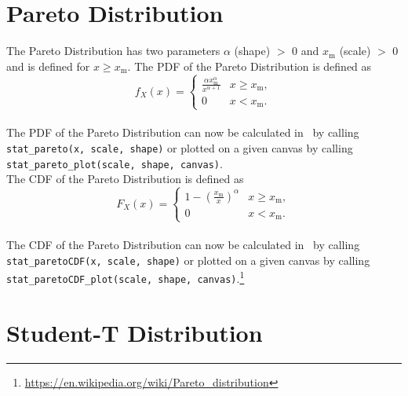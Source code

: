 	\section{Pareto Distribution}
	
		The Pareto Distribution has two parameters $\alpha$ (shape) $>$ 0 and $x_\mathrm{m}$ (scale) $>$ 0 and is defined for $x \geq x_\mathrm{m}$. The \ac{PDF} of the Pareto Distribution is defined as
		\\[0.3cm]
		$$f_X(x)= \begin{cases} \frac{\alpha x_\mathrm{m}^\alpha}{x^{\alpha+1}} & x \ge x_\mathrm{m}, \\ 0 & x < x_\mathrm{m}. \end{cases}$$
		\\[0.3cm]
		The \ac{PDF} of the Pareto Distribution can now be calculated in \setlx\ by calling \lstinline{stat_pareto(x, scale, shape)} or plotted on a given canvas by calling \lstinline{stat_pareto_plot(scale, shape, canvas)}.
		\\[0.3cm]
		The \ac{CDF} of the Pareto Distribution is defined as
		\\[0.3cm]
		$$F_X(x) = \begin{cases}1-\left(\frac{x_\mathrm{m}}{x}\right)^\alpha & x \ge x_\mathrm{m}, \\0 & x < x_\mathrm{m}.\end{cases}$$
		\\[0.3cm]
		The \ac{CDF} of the Pareto Distribution can now be calculated in \setlx\ by calling \lstinline{stat_paretoCDF(x, scale, shape)} or plotted on a given canvas by calling \lstinline{stat_paretoCDF_plot(scale, shape, canvas)}.\footnote{\url{https://en.wikipedia.org/wiki/Pareto_distribution}}
		
	\section{Student-T Distribution}
	

